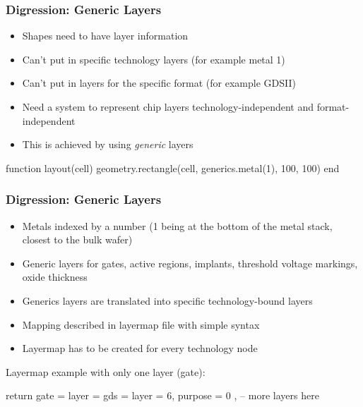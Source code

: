 \documentclass[aspectratio=169, dvipsnames, x11names, svgnames, 11pt]{beamer}
\begin{document}
\begin{frame}[fragile]
    \frametitle{Digression: Generic Layers}
    \centering
    \begin{itemize}
        \item Shapes need to have layer information
        \item Can't put in specific technology layers (for example metal 1)
        \item Can't put in layers for the specific format (for example GDSII)
        \item Need a system to represent chip layers technology-independent and format-independent
        \item This is achieved by using \emph{generic} layers
    \end{itemize}
    \vfill
    \begin{luacode}
        function layout(cell)
            geometry.rectangle(cell, generics.metal(1), 100, 100)
        end
    \end{luacode}
\end{frame}

\begin{frame}[fragile]
    \frametitle{Digression: Generic Layers}
    \centering
    \begin{itemize}
        \item Metals indexed by a number (1 being at the bottom of the metal stack, closest to the bulk wafer)
        \item Generic layers for gates, active regions, implants, threshold voltage markings, oxide thickness
        \item Generics layers are translated into specific technology-bound layers
        \item Mapping described in layermap file with simple syntax
        \item Layermap has to be created for every technology node
    \end{itemize}
    \vfill
    Layermap example with only one layer (gate):
    \begin{luacode}
        return {
            gate = { layer = { gds = { layer = 6, purpose = 0 } } },
            -- more layers here
        }
    \end{luacode}
\end{frame}
\end{document}
